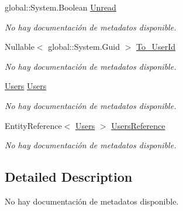 \begin{DoxyCompactItemize}
global\-::\-System.\-Boolean \hyperlink{class_game_memory_1_1_inboxes_ae67bb69c77c4981be67a1c0f993df287}{Unread}
\begin{DoxyCompactList}\small\item\em No hay documentación de metadatos disponible. \end{DoxyCompactList}\item 
Nullable$<$ global\-::\-System.\-Guid $>$ \hyperlink{class_game_memory_1_1_inboxes_ae85db34db91880df980eceb08b1a4368}{To\-\_\-\-User\-Id}
\begin{DoxyCompactList}\small\item\em No hay documentación de metadatos disponible. \end{DoxyCompactList}\item 
\hyperlink{class_game_memory_1_1_users}{Users} \hyperlink{class_game_memory_1_1_inboxes_a5c16a080fdccc957c58acf200f1b52b1}{Users}
\begin{DoxyCompactList}\small\item\em No hay documentación de metadatos disponible. \end{DoxyCompactList}\item 
Entity\-Reference$<$ \hyperlink{class_game_memory_1_1_users}{Users} $>$ \hyperlink{class_game_memory_1_1_inboxes_a61ad83251581c2d87e830ee9fcfdeb46}{Users\-Reference}
\begin{DoxyCompactList}\small\item\em No hay documentación de metadatos disponible. \end{DoxyCompactList}\end{DoxyCompactItemize}


\subsection{Detailed Description}
No hay documentación de metadatos disponible. 



